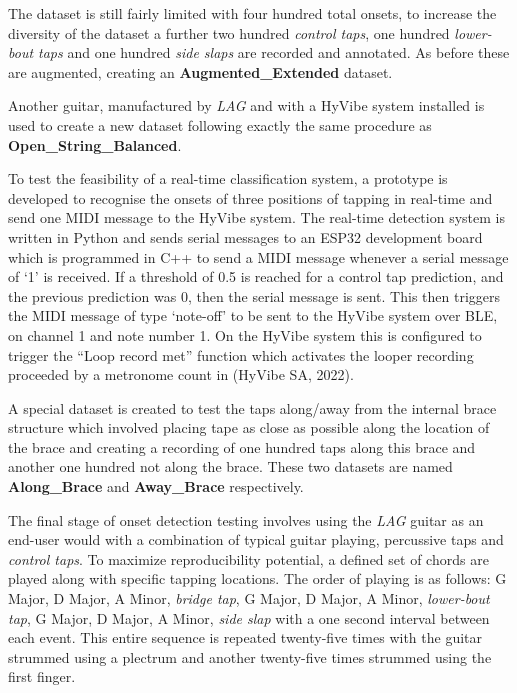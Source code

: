 \documentclass[conference]{IEEEtran}
\begin{document}
The dataset is still fairly limited with four hundred total onsets, to increase the diversity of the dataset a further two hundred \emph{control taps}, one hundred \emph{lower-bout taps} and one hundred \emph{side slaps} are recorded and annotated. As before these are augmented, creating an \textbf{Augmented\_Extended} dataset. 

Another guitar, manufactured by \emph{LAG} and with a HyVibe system installed is used to create a new dataset following exactly the same procedure as \textbf{Open\_String\_Balanced}.

To test the feasibility of a real-time classification system, a prototype is developed to recognise the onsets of three positions of tapping in real-time and send one MIDI message to the HyVibe system.
The real-time detection system is written in Python and sends serial messages to an ESP32 development board which is programmed in C++ to send a MIDI message whenever a serial
message of `1' is received. If a threshold of 0.5 is reached for a control tap prediction, and the previous prediction was 0, then the serial message is sent.
This then triggers the MIDI message of type `note-off' to be sent to the HyVibe system over BLE, on channel 1 and note number 1. On the HyVibe system this is configured to trigger the ``Loop record met'' function
which activates the looper recording proceeded by a metronome count in (HyVibe SA, 2022).

A special dataset is created to test the taps along/away from the internal brace structure which involved placing tape as close as possible along the location of the brace and creating a recording of one hundred taps along this brace and another one hundred not along the 
brace. These two datasets are named \textbf{Along\_Brace} and \textbf{Away\_Brace} respectively. 

The final stage of onset detection testing involves using the \emph{LAG} guitar as an end-user would with a combination of typical guitar playing, percussive taps and \emph{control taps}. 
To maximize reproducibility potential, a defined set of chords are played along with specific tapping locations. The order of playing is as follows: G Major, D Major, A Minor, \emph{bridge tap}, G Major, D Major, A Minor, \emph{lower-bout tap}, G Major, D Major, A Minor, \emph{side slap} with a one second interval between each event.
This entire sequence is repeated twenty-five times with the guitar strummed using a plectrum and another twenty-five times strummed using the first finger.
\end{document}

